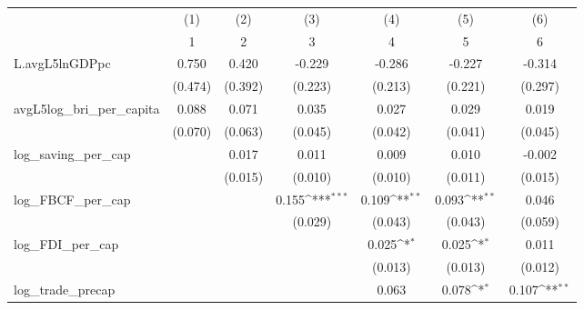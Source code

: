 {
\def\sym#1{\ifmmode^{#1}\else\(^{#1}\)\fi}
\begin{tabular}{l*{6}{c}}
\toprule
            &\multicolumn{1}{c}{(1)}&\multicolumn{1}{c}{(2)}&\multicolumn{1}{c}{(3)}&\multicolumn{1}{c}{(4)}&\multicolumn{1}{c}{(5)}&\multicolumn{1}{c}{(6)}\\
            &\multicolumn{1}{c}{1}&\multicolumn{1}{c}{2}&\multicolumn{1}{c}{3}&\multicolumn{1}{c}{4}&\multicolumn{1}{c}{5}&\multicolumn{1}{c}{6}\\
\midrule
L.avgL5lnGDPpc&       0.750         &       0.420         &      -0.229         &      -0.286         &      -0.227         &      -0.314         \\
            &     (0.474)         &     (0.392)         &     (0.223)         &     (0.213)         &     (0.221)         &     (0.297)         \\
\addlinespace
avgL5log\_bri\_per\_capita&       0.088         &       0.071         &       0.035         &       0.027         &       0.029         &       0.019         \\
            &     (0.070)         &     (0.063)         &     (0.045)         &     (0.042)         &     (0.041)         &     (0.045)         \\
\addlinespace
log\_saving\_per\_cap&                     &       0.017         &       0.011         &       0.009         &       0.010         &      -0.002         \\
            &                     &     (0.015)         &     (0.010)         &     (0.010)         &     (0.011)         &     (0.015)         \\
\addlinespace
log\_FBCF\_per\_cap&                     &                     &       0.155\sym{***}&       0.109\sym{**} &       0.093\sym{**} &       0.046         \\
            &                     &                     &     (0.029)         &     (0.043)         &     (0.043)         &     (0.059)         \\
\addlinespace
log\_FDI\_per\_cap&                     &                     &                     &       0.025\sym{*}  &       0.025\sym{*}  &       0.011         \\
            &                     &                     &                     &     (0.013)         &     (0.013)         &     (0.012)         \\
\addlinespace
log\_trade\_precap&                     &                     &                     &       0.063         &       0.078\sym{*}  &       0.107\sym{**} \\

\end{tabular}}
